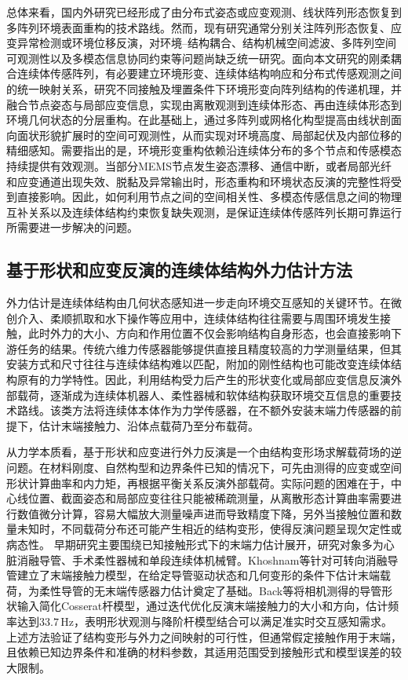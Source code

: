 总体来看，国内外研究已经形成了由分布式姿态或应变观测、线状阵列形态恢复到多阵列环境表面重构的技术路线。然而，现有研究通常分别关注阵列形态恢复、应变异常检测或环境位移反演，对环境--结构耦合、结构机械空间滤波、多阵列空间可观测性以及多模态信息协同约束等问题尚缺乏统一研究。面向本文研究的刚柔耦合连续体传感阵列，有必要建立环境形变、连续体结构响应和分布式传感观测之间的统一映射关系，研究不同接触及埋置条件下环境形变向阵列结构的传递机理，并融合节点姿态与局部应变信息，实现由离散观测到连续体形态、再由连续体形态到环境几何状态的分层重构。在此基础上，通过多阵列或网格化构型提高由线状剖面向面状形貌扩展时的空间可观测性，从而实现对环境高度、局部起伏及内部位移的精细感知。需要指出的是，环境形变重构依赖沿连续体分布的多个节点和传感模态持续提供有效观测。当部分MEMS节点发生姿态漂移、通信中断，或者局部光纤和应变通道出现失效、脱黏及异常输出时，形态重构和环境状态反演的完整性将受到直接影响。因此，如何利用节点之间的空间相关性、多模态传感信息之间的物理互补关系以及连续体结构约束恢复缺失观测，是保证连续体传感阵列长期可靠运行所需要进一步解决的问题。

\subsection{基于形状和应变反演的连续体结构外力估计方法}
外力估计是连续体结构由几何状态感知进一步走向环境交互感知的关键环节。在微创介入、柔顺抓取和水下操作等应用中，连续体结构往往需要与周围环境发生接触，此时外力的大小、方向和作用位置不仅会影响结构自身形态，也会直接影响下游任务的结果。传统六维力传感器能够提供直接且精度较高的力学测量结果，但其安装方式和尺寸往往与连续体结构难以匹配，附加的刚性结构也可能改变连续体结构原有的力学特性。因此，利用结构受力后产生的形状变化或局部应变信息反演外部载荷，逐渐成为连续体机器人、柔性器械和软体结构获取环境交互信息的重要技术路线。该类方法将连续体本体作为力学传感器，在不额外安装末端力传感器的前提下，估计末端接触力、沿体点载荷乃至分布载荷。

从力学本质看，基于形状和应变进行外力反演是一个由结构变形场求解载荷场的逆问题。在材料刚度、自然构型和边界条件已知的情况下，可先由测得的应变或空间形状计算曲率和内力矩，再根据平衡关系反演外部载荷。实际问题的困难在于，中心线位置、截面姿态和局部应变往往只能被稀疏测量，从离散形态计算曲率需要进行数值微分计算，容易大幅放大测量噪声进而导致精度下降，另外当接触位置和数量未知时，不同载荷分布还可能产生相近的结构变形，使得反演问题呈现欠定性或病态性。
早期研究主要围绕已知接触形式下的末端力估计展开，研究对象多为心脏消融导管、手术柔性器械和单段连续体机械臂。Khoshnam等针对可转向消融导管建立了末端接触力模型，在给定导管驱动状态和几何变形的条件下估计末端载荷，为柔性导管的无末端传感器力估计奠定了基础\cite{khoshnam2015modeling}。Back等将相机测得的导管形状输入简化Cosserat杆模型，通过迭代优化反演末端接触力的大小和方向，估计频率达到$33.7\,\mathrm{Hz}$，表明形状观测与降阶杆模型结合可以满足准实时交互感知需求\cite{back2015catheter}。上述方法验证了结构变形与外力之间映射的可行性，但通常假定接触作用于末端，且依赖已知边界条件和准确的材料参数，其适用范围受到接触形式和模型误差的较大限制。

